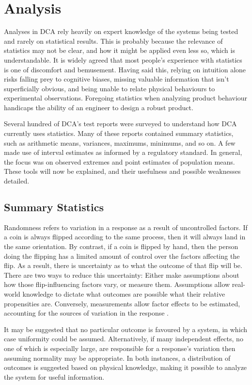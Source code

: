 \documentclass[11pt,a4paper,article]{memoir} %
\begin{document}
\vspace{48pt}
\section{Analysis}
Analyses in DCA rely heavily on expert knowledge of the systems being tested and rarely on statistical results. This is probably because the relevance of statistics may not be clear, and how it might be applied even less so, which is understandable. It is widely agreed that most people's experience with statistics is one of discomfort and bemusement. Having said this, relying on intuition alone risks falling prey to cognitive biases, missing valuable information that isn't superficially obvious, and being unable to relate physical behaviours to experimental observations. Foregoing statistics when analyzing product behaviour handicaps the ability of an engineer to design a robust product.
\par
Several hundred of DCA's test reports were surveyed to understand how DCA currently uses statistics. Many of these reports contained summary statistics, such as arithmetic means, variances, maximums, minimums, and so on. A few made use of interval estimates as informed by a regulatory standard. In general, the focus was on observed extremes and point estimates of population means. These tools will now be explained, and their usefulness and possible weaknesses detailed.
\par
\subsection*{Summary Statistics}
 Randomness refers to variation in a response as a result of uncontrolled factors. If a coin is always flipped according to the same process, then it will always land in the same orientation. By contrast, if a coin is flipped by hand, then the person doing the flipping has a limited amount of control over the factors affecting the flip. As a result, there is uncertainty as to what the outcome of that flip will be. There are two ways to reduce this uncertainty: Either make assumptions about how those flip-influencing factors vary, or measure them. Assumptions allow real-world knowledge to dictate what outcomes are possible what their relative propensities are. Conversely, measurements allow factor effects to be estimated, accounting for the sources of variation in the response \cite{jaynes2003probability}.
 
 It may be suggested that no particular outcome is favoured by a system, in which case uniformity could be assumed. Alternatively, if many independent effects, no one of which is especially large, are responsible for a response's variation then assuming normality may be appropriate. In both instances, a distribution of outcomes is suggested based on physical knowledge, making it possible to analyze the system for useful information.
 
\end{document}
